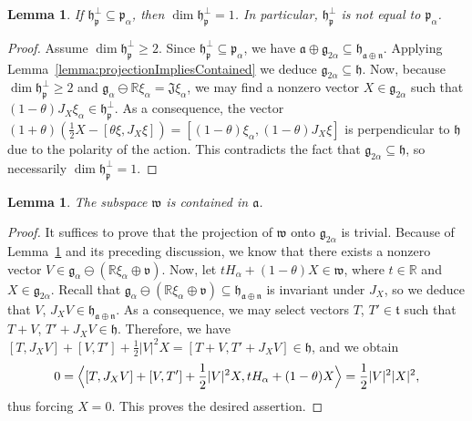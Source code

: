 \documentclass[12pt, a4paper]{amsart}
\newcommand{\g}{\mathfrak}
\newcommand{\R}{\mathbb{R}}
\newtheorem{lemma}[theorem]{Lemma}
\theoremstyle{definition}
\begin{document}
\begin{lemma}\label{lemma:spperp-not-p-alpha}
If $\g{h}_{\g{p}}^\perp\subseteq\g{p}_\alpha$, then $\dim \g{h}_{\g{p}}^\perp=1$.
In particular, $\g{h}_{\g{p}}^\perp$ is not equal to $\g{p}_\alpha$.
\end{lemma}

\begin{proof}
Assume $\dim \g{h}_{\g{p}}^\perp\geq 2$.
Since $\g{h}_{\g{p}}^{\perp}\subseteq \g{p}_{\alpha}$, we have $\g{a}\oplus\g{g}_{2\alpha}\subseteq\g{h}_{\g{a}\oplus\g{n}}$.
Applying Lemma~\ref{lemma:projectionImpliesContained} we deduce  $\g{g}_{2\alpha}\subseteq \g{h}$.
Now, because $\dim \g{h}_{\g{p}}^\perp\geq 2$ and 
$\g{g}_\alpha\ominus\R \xi_\alpha = \g{J}\xi_\alpha$, we may find a nonzero vector $X\in\g{g}_{2\alpha}$ such that $(1-\theta)J_X\xi_\alpha\in\g{h}_{\g{p}}^\perp$.
As a consequence, the vector 
$(1+\theta)(\tfrac{1}{2}X -[\theta \xi, J_X \xi])
=[(1-\theta)\xi_\alpha,(1-\theta)J_X \xi]$ is perpendicular to $\g{h}$ due to the polarity of the action.
This contradicts the fact that $\g{g}_{2\alpha}\subseteq \g{h}$, so necessarily $\dim \g{h}_{\g{p}}^\perp=1$.
\end{proof}

\begin{lemma}
The subspace $\g{w}$ is contained in $\g{a}$.
\end{lemma}

\begin{proof}
It suffices to prove that the projection of $\g{w}$ onto $\g{g}_{2\alpha}$ is trivial.
Because of Lemma~\ref{lemma:spperp-not-p-alpha} and its preceding discussion, we know that there exists a nonzero vector $V\in\g{g}_{\alpha}\ominus(\R\xi_\alpha\oplus \g{v})$.
Now, let $tH_\alpha+(1-\theta)X\in\g{w}$, where $t\in \R$ and $X\in\g{g}_{2\alpha}$.
Recall that $\g{g}_{\alpha}\ominus(\R\xi_\alpha\oplus\g{v})\subseteq \g{h}_{\g{a}\oplus\g{n}}$ is invariant under $J_X$, so we deduce that $V$, $J_X V\in \g{h}_{\g{a}\oplus\g{n}}$.
As a consequence, we may select vectors $T$, $T'\in\g{t}$ such that $T+V$, $T'+J_X V\in\g{h}$.
Therefore, we have $[T,J_X V]+[V,T']+\tfrac{1}{2}\lvert V \rvert^2 X=[T+V,T'+J_X V]\in\g{h}$, and we obtain
\begin{equation*}
0=\Bigl< [T,J_X V]+[V,T']+\frac{1}{2}\lvert V \rvert^2 X, tH_\alpha+(1-\theta)X \Bigr> = \frac{1}{2}\lvert V \rvert^2 \lvert X \rvert^2,
\end{equation*}
thus forcing $X=0$.
This proves the desired assertion.\qedhere
\end{proof}
\end{document}
